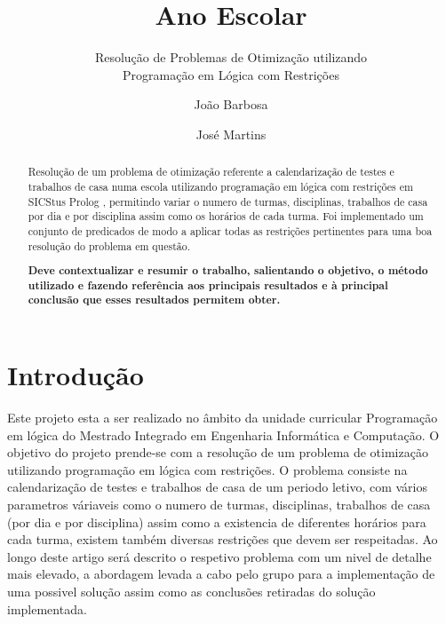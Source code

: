 \documentclass{llncs}
\begin{document}
%
\frontmatter          %
%
\pagestyle{headings}  %
%
\title{Ano Escolar}
\subtitle{Resolução de Problemas de Otimização utilizando\\
Programação em Lógica com Restrições}
%
%
\author{João Barbosa \and José Martins}
%
%

\maketitle              %

\begin{abstract} %

Resolução de um problema de otimização referente a calendarização de testes e trabalhos de casa numa escola utilizando programação em lógica com restrições em SICStus Prolog , permitindo variar o numero de turmas, disciplinas, trabalhos de casa por dia e por disciplina assim como os horários de cada turma.
Foi implementado um conjunto de predicados de modo a aplicar todas as restrições pertinentes para uma boa resolução do problema em questão.

\textbf{
Deve contextualizar e resumir o trabalho, salientando o objetivo, o
método utilizado e fazendo referência aos principais resultados e à principal conclusão que
esses resultados permitem obter.}


\end{abstract}
%
\section{Introdução}
%
Este projeto esta a ser realizado no âmbito da unidade curricular Programação em lógica do Mestrado Integrado em Engenharia Informática e Computação.
O objetivo do projeto prende-se com a resolução de um problema de otimização utilizando programação em lógica com restrições.
O problema consiste na calendarização de testes e trabalhos de casa de um periodo letivo, com vários parametros váriaveis como o numero de turmas, disciplinas, trabalhos de casa (por dia e por disciplina) assim como a existencia de diferentes horários para cada turma, existem também diversas restrições que devem ser respeitadas.
Ao longo deste artigo será descrito o respetivo problema com um nivel de detalhe mais elevado, a abordagem levada a cabo pelo grupo para a implementação de uma possivel solução assim como as conclusões retiradas do solução implementada.
\end{document}
